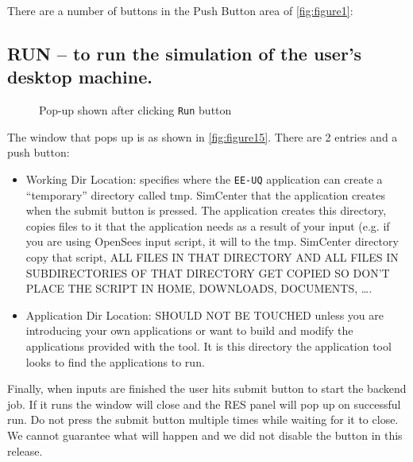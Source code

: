 There are a number of buttons in the Push Button area of \autoref{fig:figure1}:

\subsection{RUN – to run the simulation of the user’s desktop machine.}
\begin{figure}[!htbp]
  \caption{Pop-up shown after clicking \texttt{Run} button}
  \label{fig:figure15}
\end{figure}

The window that pops up is as shown in \autoref{fig:figure15}. There
are 2 entries and a push button:

\begin{itemize}
\item Working Dir Location: specifies where the \texttt{EE-UQ} application can create a “temporary” directory called tmp. SimCenter that the application 
creates when the submit button is pressed. The application creates
this directory, copies files to it that the application needs as a
result of your input (e.g. if you are using OpenSees input script, it
will to the tmp. SimCenter directory copy that script, ALL FILES IN
THAT DIRECTORY AND ALL FILES IN SUBDIRECTORIES OF THAT DIRECTORY GET
COPIED SO DON’T PLACE THE SCRIPT IN HOME, DOWNLOADS, DOCUMENTS, ….
\item Application Dir Location: SHOULD NOT BE TOUCHED unless you are introducing your own applications or want to build and modify the 
applications provided with the tool. It is this directory the
application tool looks to find the applications to run.
\end{itemize}


Finally, when inputs are finished the user hits submit button to start
the backend job. If it runs the window will close and the RES panel
will pop up on successful run. Do not press the submit button multiple
times while waiting for it to close. We cannot guarantee what will
happen and we did not disable the button in this release.

